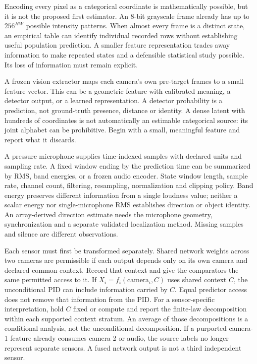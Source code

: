 \documentclass[11pt,a4paper]{article}
\begin{document}
Encoding every pixel as a categorical coordinate is mathematically possible, but it is not the proposed first estimator. An 8-bit grayscale frame already has up to \(256^{HW}\) possible intensity patterns. When almost every frame is a distinct state, an empirical table can identify individual recorded rows without establishing useful population prediction. A smaller feature representation trades away information to make repeated states and a defensible statistical study possible. Its loss of information must remain explicit.

A frozen vision extractor maps each camera's own pre-target frames to a small feature vector. This can be a geometric feature with calibrated meaning, a detector output, or a learned representation. A detector probability is a prediction, not ground-truth presence, distance or identity. A dense latent with hundreds of coordinates is not automatically an estimable categorical source: its joint alphabet can be prohibitive. Begin with a small, meaningful feature and report what it discards.

A pressure microphone supplies time-indexed samples with declared units and sampling rate. A fixed window ending by the prediction time can be summarized by RMS, band energies, or a frozen audio encoder. State window length, sample rate, channel count, filtering, resampling, normalization and clipping policy. Band energy preserves different information from a single loudness value; neither a scalar energy nor single-microphone RMS establishes direction or object identity. An array-derived direction estimate needs the microphone geometry, synchronization and a separate validated localization method. Missing samples and silence are different observations.

Each sensor must first be transformed separately. Shared network weights across two cameras are permissible if each output depends only on its own camera and declared common context. Record that context and give the comparators the same permitted access to it. If \(X_i=f_i(\mathrm{camera}_i,C)\) uses shared context \(C\), the unconditional PID can include information carried by \(C\). Equal predictor access does not remove that information from the PID. For a sensor-specific interpretation, hold \(C\) fixed or compute and report the finite-law decomposition within each supported context stratum. An average of those decompositions is a conditional analysis, not the unconditional decomposition. If a purported camera-1 feature already consumes camera 2 or audio, the source labels no longer represent separate sensors. A fused network output is not a third independent sensor.
\end{document}
